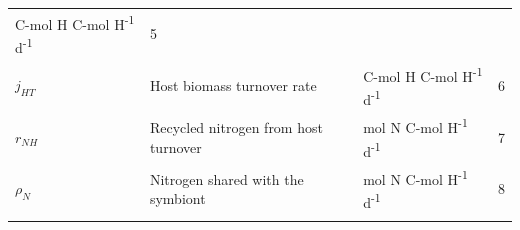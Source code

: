 \documentclass[]{elsarticle} %
\begin{document}
\begin{longtable}[]{@{}llll@{}}
\begin{minipage}[t]{0.26\columnwidth}
C-mol H C-mol H\textsuperscript{-1} d\textsuperscript{-1}\strut
\end{minipage} & \begin{minipage}[t]{0.09\columnwidth}\raggedright\strut
5\strut
\end{minipage}\tabularnewline
\begin{minipage}[t]{0.09\columnwidth}\raggedright\strut
\(j_{HT}\)\strut
\end{minipage} & \begin{minipage}[t]{0.44\columnwidth}\raggedright\strut
Host biomass turnover rate\strut
\end{minipage} & \begin{minipage}[t]{0.26\columnwidth}\raggedright\strut
C-mol H C-mol H\textsuperscript{-1} d\textsuperscript{-1}\strut
\end{minipage} & \begin{minipage}[t]{0.09\columnwidth}\raggedright\strut
6\strut
\end{minipage}\tabularnewline
\begin{minipage}[t]{0.09\columnwidth}\raggedright\strut
\(r_{NH}\)\strut
\end{minipage} & \begin{minipage}[t]{0.44\columnwidth}\raggedright\strut
Recycled nitrogen from host turnover\strut
\end{minipage} & \begin{minipage}[t]{0.26\columnwidth}\raggedright\strut
mol N C-mol H\textsuperscript{-1} d\textsuperscript{-1}\strut
\end{minipage} & \begin{minipage}[t]{0.09\columnwidth}\raggedright\strut
7\strut
\end{minipage}\tabularnewline
\begin{minipage}[t]{0.09\columnwidth}\raggedright\strut
\(\rho_N\)\strut
\end{minipage} & \begin{minipage}[t]{0.44\columnwidth}\raggedright\strut
Nitrogen shared with the symbiont\strut
\end{minipage} & \begin{minipage}[t]{0.26\columnwidth}\raggedright\strut
mol N C-mol H\textsuperscript{-1} d\textsuperscript{-1}\strut
\end{minipage} & \begin{minipage}[t]{0.09\columnwidth}\raggedright\strut
8\strut
\end{minipage}\tabularnewline
\begin{minipage}[t]{0.09\columnwidth}\raggedright\strut

\end{minipage}
\end{longtable}
\end{document}
